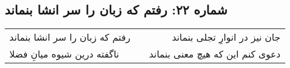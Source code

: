 \begin{center}
\section*{شماره ۲۲: رفتم که زبان را سر انشا بنماند}
\label{sec:022}
\begin{longtable}{l p{0.5cm} r}
رفتم که زبان را سر انشا بنماند
&&
جان نیز در انوارِ تجلی بنماند
\\
ناگفته درین شیوه میانِ فضلا
&&
دعوی کنم این که هیچ معنی بنماند
\\
\end{longtable}
\end{center}
